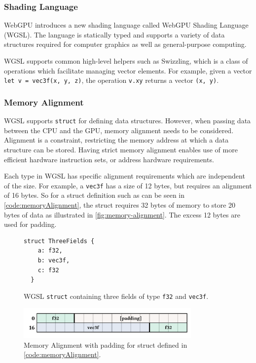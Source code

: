 \subsubsection{Shading Language}

WebGPU introduces a new shading language called WebGPU Shading Language (WGSL). The language is statically typed and supports a variety of data structures required for computer graphics as well as general-purpose computing.

WGSL supports common high-level helpers such as Swizzling, which is a class of operations which facilitate managing vector elements. For example, given a vector \verb|let v = vec3f(x, y, z)|, the operation \verb|v.xy| returns a vector \verb|(x, y)|.

\subsubsection{Memory Alignment}

WGSL supports \verb|struct| for defining data structures. However, when passing data between the CPU and the GPU, memory alignment needs to be considered. Alignment is a constraint, restricting the memory address at which a data structure can be stored. Having strict memory alignment enables use of more efficient hardware instruction sets, or address hardware requirements.

Each type in WGSL has specific alignment requirements which are independent of the size. For example, a \verb|vec3f| has a size of 12 bytes, but requires an alignment of 16 bytes. So for a struct definition such as can be seen in \autoref{code:memoryAlignment}, the struct requires 32 bytes of memory to store 20 bytes of data as illustrated in \autoref{fig:memory-alignment}. The excess 12 bytes are used for padding.

\begin{figure}[H]
  \begin{lstlisting}[style=wgsl]
  struct ThreeFields {
    a: f32,
    b: vec3f,
    c: f32
  }
  \end{lstlisting}
  \caption{WGSL \texttt{struct} containing three fields of type \texttt{f32} and \texttt{vec3f}.}
  \label{code:memoryAlignment}
  \end{figure}

\begin{figure}[H]
  \centering
  \includegraphics[width=0.8\textwidth]{resources/memory-alignment.png}
  \caption{Memory Alignment with padding for struct defined in \autoref{code:memoryAlignment}.}
  \label{fig:memory-alignment}
\end{figure}

